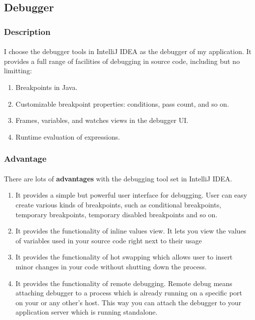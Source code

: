 \documentclass[10pt]{article}
\begin{document}
\subsection{Debugger}
\subsubsection{Description}
\paragraph{}
I choose the debugger tools in IntelliJ IDEA as the debugger of my application. It provides a full range of facilities of debugging in source code, including but no limitting: 
\begin{enumerate}
    \item Breakpoints in Java.
    \item Customizable breakpoint properties: conditions, pass count, and so on.
    \item Frames, variables, and watches views in the debugger UI.
    \item Runtime evaluation of expressions.
\end{enumerate}

\subsubsection{Advantage}
\paragraph{}
There are lots of \textbf{advantages} with the debugging tool set in IntelliJ IDEA. 

\begin{enumerate}
    \item It provides a simple but powerful user interface for debugging. User can easy create various kinds of breakpoints, such as conditional breakpoints,  temporary breakpoints,  temporary disabled breakpoints and so on.
    \item It provides the functionality of inline values view.  It lets you view the values of variables used in your source code right next to their usage
    \item It provides the functionality of hot swapping which allows user to insert minor changes in your code without shutting down the process.
    \item It provides the functionality of remote debugging. Remote debug means attaching debugger to a process which is already running on a specific port on your or any other’s host. This way you can attach the debugger to your application server which is running standalone.
\end{enumerate}
\end{document}
